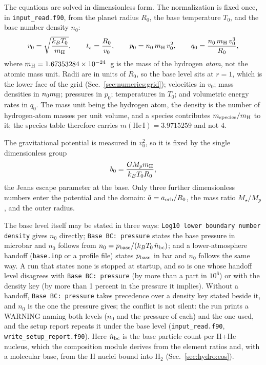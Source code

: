 The equations are solved in dimensionless form.  The normalization is fixed
once, in \texttt{input\_read.f90}, from the planet radius $R_0$, the base
temperature $T_0$, and the base number density $n_0$:
%
\begin{equation}
  v_0 = \sqrt{\frac{k_B T_0}{m_{\rm H}}}, \qquad
  t_s = \frac{R_0}{v_0}, \qquad
  p_0 = n_0\,m_{\rm H}\,v_0^2, \qquad
  q_0 = \frac{n_0\,m_{\rm H}\,v_0^3}{R_0},
  \label{eq:units}
\end{equation}
%
where $m_{\rm H} = 1.67353284\times10^{-24}$~g is the mass of the hydrogen
\emph{atom}, not the atomic mass unit.  Radii are in units of $R_0$, so the
base level sits at $r = 1$, which is the lower face of the grid
(Sec.~\ref{sec:numerics:grid}); velocities in $v_0$; mass densities in
$n_0m_{\rm H}$; pressures in $p_0$; temperatures in $T_0$; and volumetric energy
rates in $q_0$.  The mass unit being the hydrogen atom, the density is the
number of hydrogen-atom masses per unit volume, and a species contributes
$m_{\rm species}/m_{\rm H}$ to it; the species table therefore carries
$m(\mathrm{He\,I}) = 3.9715259$ and not $4$.

The gravitational potential is measured in $v_0^2$, so it is fixed by the
single dimensionless group
%
\begin{equation}
  b_0 = \frac{G M_p m_{\rm H}}{k_B T_0 R_0},
  \label{eq:b0}
\end{equation}
%
the Jeans escape parameter at the base.  Only three further dimensionless
numbers enter the potential and the domain: $\tilde a = a_{\rm orb}/R_0$, the
mass ratio $M_\star/M_p$, and the outer radius.

The base level itself may be stated in three ways: \texttt{Log10 lower
boundary number density} gives $n_0$ directly; \texttt{Base BC: pressure}
states the base pressure in microbar and $n_0$ follows from
$n_0 = p_{\rm base}/(k_B T_0\,\hat n_{\rm bc})$; and a lower-atmosphere
handoff (\texttt{base.inp} or a profile file) states $p_{\rm base}$ in bar
and $n_0$ follows the same way.  A run that states none is stopped at
startup, and so is one whose handoff level disagrees with \texttt{Base BC:
pressure} (by more than a part in $10^{6}$) or with the density key (by more
than 1 percent in the pressure it implies).  Without a handoff,
\texttt{Base BC: pressure} takes precedence over a density key stated beside
it, and $n_0$ is the one the pressure gives; the conflict is not silent: the
run prints a WARNING naming both levels ($n_0$ and the pressure of each) and
the one used, and the setup report repeats it under the base level
(\texttt{input\_read.f90}, \texttt{write\_setup\_report.f90}).  Here $\hat n_{\rm bc}$ is the base particle
count per H+He nucleus, which the composition module derives from the
element ratios and, with a molecular base, from the H nuclei bound into
$\mathrm{H}_2$ (Sec.~\ref{sec:hydro:eos}).

